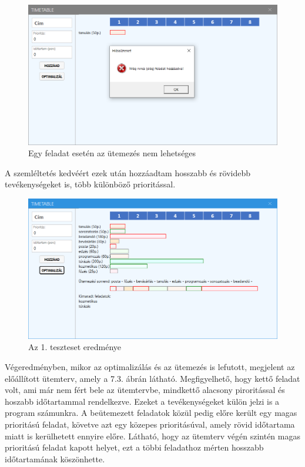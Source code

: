 \begin{figure}[h]
	\centering
	\includegraphics[scale=0.6]{images/test/notEnoughTasks.png}
	\caption{Egy feladat esetén az ütemezés nem lehetséges}
\end{figure}

A szemléltetés kedvéért ezek után hozzáadtam hosszabb és rövidebb tevékenységeket is, több különböző prioritással. 

\begin{figure}[h]
	\centering
	\includegraphics[scale=0.6]{images/test/result1.png}
	\caption{Az 1. teszteset eredménye}
\end{figure}

Végeredményben, mikor az optimalizálás és az ütemezés is lefutott, megjelent az előállított ütemterv, amely a 7.3. ábrán látható. Megfigyelhető, hogy kettő feladat volt, ami már nem fért bele az ütemtervbe, mindkettő alacsony piroritással és hoszabb időtartammal rendelkezve. Ezeket a tevékenységeket külön jelzi is a program számunkra. A beütemezett feladatok közül pedig előre került egy magas prioritású feladat, követve azt egy közepes prioritásúval, amely rövid időtartama miatt is kerülhetett ennyire előre. Látható, hogy az ütemterv végén szintén magas prioritású feladat kapott helyet, ezt a többi feladathoz mérten hosszabb időtartamának köszönhette.


